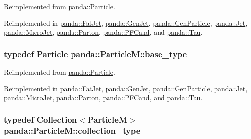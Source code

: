 Reimplemented from \hyperlink{classpanda_1_1Particle_ac7774202a46a6e99815ebbda009cdeff}{panda::Particle}.

Reimplemented in \hyperlink{classpanda_1_1FatJet_af8c5781a44a91eb012c01dde2a710039}{panda::FatJet}, \hyperlink{classpanda_1_1GenJet_a732a43640504ffa4b44865f9eb422f74}{panda::GenJet}, \hyperlink{classpanda_1_1GenParticle_acacbe638e5f065cfe0d3bc8ca5ecd5ee}{panda::GenParticle}, \hyperlink{classpanda_1_1Jet_a02ed819ca5ca46b0b3b212dbd56bce57}{panda::Jet}, \hyperlink{classpanda_1_1MicroJet_ac1892a7cfd937c8967fce27bcff9cdc7}{panda::MicroJet}, \hyperlink{classpanda_1_1Parton_a779a461ff7aa46eda35c663576532b02}{panda::Parton}, \hyperlink{classpanda_1_1PFCand_aea303dd18044eafc5ea0953e22f2f095}{panda::PFCand}, and \hyperlink{classpanda_1_1Tau_a74a1cb1b70bdd2212670492156eecc50}{panda::Tau}.\hypertarget{classpanda_1_1ParticleM_a134d640b78531bc47ddb19ba490de07d}{
\subsubsection[{base\_\-type}]{\setlength{\rightskip}{0pt plus 5cm}typedef {\bf Particle} {\bf panda::ParticleM::base\_\-type}}}
\label{classpanda_1_1ParticleM_a134d640b78531bc47ddb19ba490de07d}


Reimplemented from \hyperlink{classpanda_1_1Particle_a0055c0e7a7015a0446f6c4f8e6f1d469}{panda::Particle}.

Reimplemented in \hyperlink{classpanda_1_1FatJet_ab06dcce3d9c117c93a036c87fb441795}{panda::FatJet}, \hyperlink{classpanda_1_1GenJet_acec2fc5754d9d9da9805cbdaff566ee4}{panda::GenJet}, \hyperlink{classpanda_1_1GenParticle_ab81b9a915960640d959816ecbf1397ec}{panda::GenParticle}, \hyperlink{classpanda_1_1Jet_a4fbfc283916dbd345b13a61396b878cf}{panda::Jet}, \hyperlink{classpanda_1_1MicroJet_a2d604c4fa862edcde48e188002052ece}{panda::MicroJet}, \hyperlink{classpanda_1_1Parton_a4a5dd86c3661af38dced3271214551c4}{panda::Parton}, \hyperlink{classpanda_1_1PFCand_a2c9c280056db9b280276ec15926e7043}{panda::PFCand}, and \hyperlink{classpanda_1_1Tau_aeeec56f6b40c4aa834d50e298430fdb4}{panda::Tau}.\hypertarget{classpanda_1_1ParticleM_ae39fbe234c21960d067e8790541d0d68}{
\subsubsection[{collection\_\-type}]{\setlength{\rightskip}{0pt plus 5cm}typedef {\bf Collection}$<${\bf ParticleM}$>$ {\bf panda::ParticleM::collection\_\-type}}}
\label{classpanda_1_1ParticleM_ae39fbe234c21960d067e8790541d0d68}


